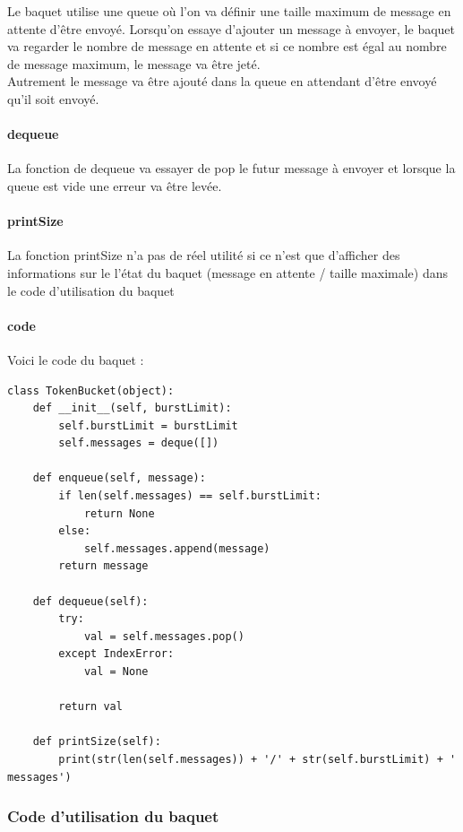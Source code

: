 \documentclass{article}
\begin{document}
Le baquet utilise une queue où l'on va définir une taille maximum de message en attente d'être envoyé. Lorsqu'on essaye d'ajouter un message à envoyer, le baquet va regarder le nombre de message en attente et si ce nombre est égal au nombre de message maximum, le message va être jeté.\\

Autrement le message va être ajouté dans la queue en attendant d'être envoyé qu'il soit envoyé.

\paragraph{dequeue}

La fonction de dequeue va essayer de pop le futur message à envoyer et lorsque la queue est vide une erreur va être levée.

\paragraph{printSize}

La fonction printSize n'a pas de réel utilité si ce n'est que d'afficher des informations sur le l'état du baquet (message en attente / taille maximale) dans le code d'utilisation du baquet

\paragraph{code}

Voici le code du baquet : 

\begin{lstlisting}
class TokenBucket(object):
	def __init__(self, burstLimit):
		self.burstLimit = burstLimit
		self.messages = deque([])
	
	def enqueue(self, message):
		if len(self.messages) == self.burstLimit:
			return None
		else:
			self.messages.append(message)
		return message
	
	def dequeue(self):
		try:
			val = self.messages.pop()
		except IndexError:
			val = None
		
		return val
	
	def printSize(self):
		print(str(len(self.messages)) + '/' + str(self.burstLimit) + ' messages')
\end{lstlisting}

\subsubsection{Code d'utilisation du baquet}
\end{document}
